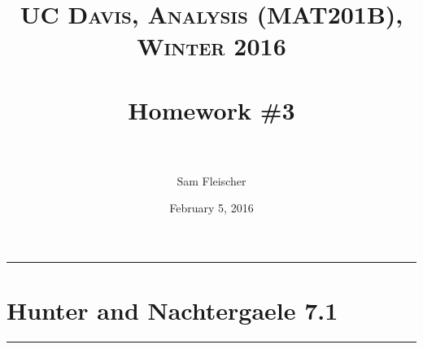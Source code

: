 \documentclass[fontsize=11pt]{article} %
\title{ 
\normalfont \normalsize 
\textsc{UC Davis, Analysis (MAT201B), Winter 2016} \\ [25pt] %
\horrule{2pt} \\[0.4cm] %
\Huge Homework \#3 \\ %
\horrule{2pt} \\[0.5cm] %
}
\author{\huge Sam Fleischer} %
\date{February 5, 2016} %
\theoremstyle{plain}
\numberwithin{equation}{section} %
\numberwithin{figure}{section} %
\numberwithin{table}{section} %
\begin{document}
\thispagestyle{empty}

\maketitle %

\makeatletter
{}
\makeatother

\pagebreak

\begin{center}
    \noindent\rule{5cm}{1pt}
\end{center}
\section{\bf Hunter and Nachtergaele 7.1}
\begin{center}
    \noindent\rule{5cm}{1pt}
\end{center}
\end{document}
